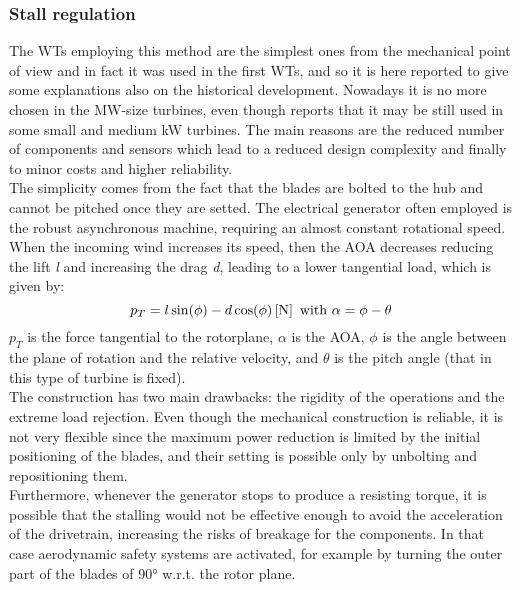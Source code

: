 \subsubsection{Stall regulation}\label{subsec:stall_regulation_theory}
The \acrshort{WTs} employing this method are the simplest ones from the mechanical point of view and in fact it was used in the first WTs, and so it is here reported to give some explanations also on the historical development. Nowadays it is no more chosen in the MW-size turbines, even though \cite{Grasso_2016} reports that it may be still used in some small and medium kW turbines. The main reasons are the reduced number of components and sensors which lead to a reduced design complexity and finally to minor costs and higher reliability. \\
The simplicity comes from the fact that the blades are bolted to the hub and cannot be pitched once they are setted. The electrical generator often employed is the robust asynchronous machine, requiring an almost constant rotational speed.\\
When the incoming wind increases its speed, then the \acrshort{AOA} decreases reducing the lift \textit{l} and increasing the drag \textit{d}, leading to a lower tangential load, which is given by:
\begin{equation}
  p_T = l \sin(\phi) - d \cos(\phi) \left[\si{\newton}\right] \text{ with } \alpha = \phi - \theta
  \label{eq:tangential_load}
\end{equation}
$p_T$ is the force tangential to the rotorplane, $\alpha$ is the \acrshort{AOA}, $\phi$ is the angle between the plane of rotation and the relative velocity, and $\theta$ is the pitch angle (that in this type of turbine is fixed).\\ 
The construction has two main drawbacks: the rigidity of the operations and the extreme load rejection. Even though the mechanical construction is reliable, it is not very flexible since the maximum power reduction is limited by the initial positioning of the blades, and their setting is possible only by unbolting and repositioning them.\\
Furthermore, whenever the generator stops to produce a resisting torque, it is possible that the stalling would not be effective enough to avoid the acceleration of the drivetrain, increasing the risks of breakage for the components. In that case aerodynamic safety systems are activated, for example by turning the outer part of the blades of 90$\si{\degree}$ w.r.t. the rotor plane. 

